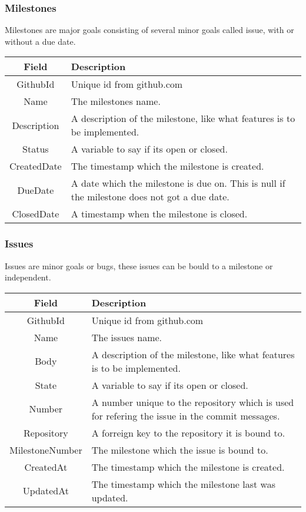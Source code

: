\subsubsection*{Milestones}
Milestones are major goals consisting of several minor goals called issue, with or without a due date. \\

\vspace{0.5cm}
\begin{tabularx}{\linewidth}{| c | X |}
    \hline
    \rowcolor[gray]{0.8}
    \textbf{Field} & \textbf{Description} \\
    \hline
    GithubId & Unique id from github.com\\ \hline
    Name & The milestones name.\\ \hline
   	Description & A description of the milestone, like what features is to be implemented.\\ \hline
    Status & A variable to say if its open or closed.\\ \hline
    CreatedDate & The timestamp which the milestone is created.\\ \hline
    DueDate & A date which the milestone is due on. This is null if the milestone does not got a due date.\\ \hline
    ClosedDate & A timestamp when the milestone is closed.\\ 
    \hline
\end{tabularx}
\vspace{0.5cm}

\subsubsection*{Issues}
Issues are minor goals or bugs, these issues can be bould to a milestone or independent. \\

\vspace{0.5cm}
\begin{tabularx}{\linewidth}{| c | X |}
    \hline
    \rowcolor[gray]{0.8}
    \textbf{Field} & \textbf{Description} \\
    \hline
    GithubId & Unique id from github.com\\ \hline
    Name & The issues name.\\ \hline
   	Body & A description of the milestone, like what features is to be implemented.\\ \hline
    State & A variable to say if its open or closed.\\ \hline
    Number & A number unique to the repository which is used for refering the issue in the commit messages.\\ \hline
    Repository & A forreign key to the repository it is bound to.\\ \hline
    MilestoneNumber & The milestone which the issue is bound to.\\ \hline
    CreatedAt & The timestamp which the milestone is created.\\ \hline
    UpdatedAt & The timestamp which the milestone last was updated.\\ 
    \hline
\end{tabularx}
\vspace{0.5cm}

